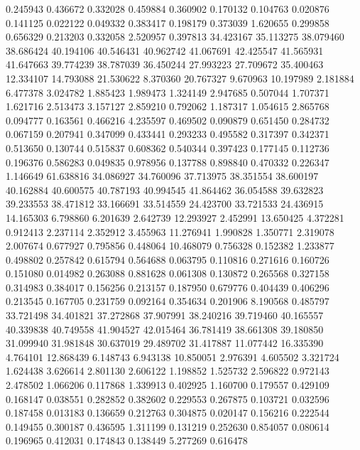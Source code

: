 0.245943
0.436672
0.332028
0.459884
0.360902
0.170132
0.104763
0.020876
0.141125
0.022122
0.049332
0.383417
0.198179
0.373039
1.620655
0.299858
0.656329
0.213203
0.332058
2.520957
0.397813
34.423167
35.113275
38.079460
38.686424
40.194106
40.546431
40.962742
41.067691
42.425547
41.565931
41.647663
39.774239
38.787039
36.450244
27.993223
27.709672
35.400463
12.334107
14.793088
21.530622
8.370360
20.767327
9.670963
10.197989
2.181884
6.477378
3.024782
1.885423
1.989473
1.324149
2.947685
0.507044
1.707371
1.621716
2.513473
3.157127
2.859210
0.792062
1.187317
1.054615
2.865768
0.094777
0.163561
0.466216
4.235597
0.469502
0.090879
0.651450
0.284732
0.067159
0.207941
0.347099
0.433441
0.293233
0.495582
0.317397
0.342371
0.513650
0.130744
0.515837
0.608362
0.540344
0.397423
0.177145
0.112736
0.196376
0.586283
0.049835
0.978956
0.137788
0.898840
0.470332
0.226347
1.146649
61.638816
34.086927
34.760096
37.713975
38.351554
38.600197
40.162884
40.600575
40.787193
40.994545
41.864462
36.054588
39.632823
39.233553
38.471812
33.166691
33.514559
24.423700
33.721533
24.436915
14.165303
6.798860
6.201639
2.642739
12.293927
2.452991
13.650425
4.372281
0.912413
2.237114
2.352912
3.455963
11.276941
1.990828
1.350771
2.319078
2.007674
0.677927
0.795856
0.448064
10.468079
0.756328
0.152382
1.233877
0.498802
0.257842
0.615794
0.564688
0.063795
0.110816
0.271616
0.160726
0.151080
0.014982
0.263088
0.881628
0.061308
0.130872
0.265568
0.327158
0.314983
0.384017
0.156256
0.213157
0.187950
0.679776
0.404439
0.406296
0.213545
0.167705
0.231759
0.092164
0.354634
0.201906
8.190568
0.485797
33.721498
34.401821
37.272868
37.907991
38.240216
39.719460
40.165557
40.339838
40.749558
41.904527
42.015464
36.781419
38.661308
39.180850
31.099940
31.981848
30.637019
29.489702
31.417887
11.077442
16.335390
4.764101
12.868439
6.148743
6.943138
10.850051
2.976391
4.605502
3.321724
1.624438
3.626614
2.801130
2.606122
1.198852
1.525732
2.596822
0.972143
2.478502
1.066206
0.117868
1.339913
0.402925
1.160700
0.179557
0.429109
0.168147
0.038551
0.282852
0.382602
0.229553
0.267875
0.103721
0.032596
0.187458
0.013183
0.136659
0.212763
0.304875
0.020147
0.156216
0.222544
0.149455
0.300187
0.436595
1.311199
0.131219
0.252630
0.854057
0.080614
0.196965
0.412031
0.174843
0.138449
5.277269
0.616478
